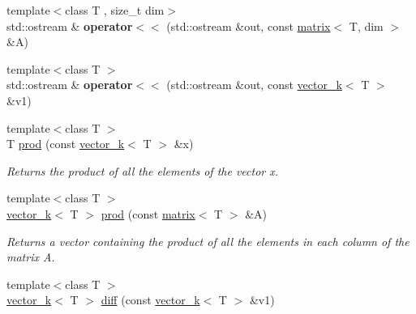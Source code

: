 \begin{DoxyCompactItemize}
\item 
\hypertarget{namespacekeycpp_abdc9a2ec3fa602bd1bad9cd9ea14038e}{{\footnotesize template$<$class T , size\-\_\-t dim$>$ }\\std\-::ostream \& {\bfseries operator$<$$<$} (std\-::ostream \&out, const \hyperlink{classkeycpp_1_1matrix}{matrix}$<$ T, dim $>$ \&A)}\label{namespacekeycpp_abdc9a2ec3fa602bd1bad9cd9ea14038e}

\item 
\hypertarget{namespacekeycpp_a86f8946c126102b4467b70da16766b7a}{{\footnotesize template$<$class T $>$ }\\std\-::ostream \& {\bfseries operator$<$$<$} (std\-::ostream \&out, const \hyperlink{classkeycpp_1_1vector__k}{vector\-\_\-k}$<$ T $>$ \&v1)}\label{namespacekeycpp_a86f8946c126102b4467b70da16766b7a}

\item 
\hypertarget{namespacekeycpp_add55ad2a40111d6368744a3d4144f25a}{{\footnotesize template$<$class T $>$ }\\T \hyperlink{namespacekeycpp_add55ad2a40111d6368744a3d4144f25a}{prod} (const \hyperlink{classkeycpp_1_1vector__k}{vector\-\_\-k}$<$ T $>$ \&x)}\label{namespacekeycpp_add55ad2a40111d6368744a3d4144f25a}

\begin{DoxyCompactList}\small\item\em Returns the product of all the elements of the vector x. \end{DoxyCompactList}\item 
\hypertarget{namespacekeycpp_af5471fc9074471701bde9e68eb7971b4}{{\footnotesize template$<$class T $>$ }\\\hyperlink{classkeycpp_1_1vector__k}{vector\-\_\-k}$<$ T $>$ \hyperlink{namespacekeycpp_af5471fc9074471701bde9e68eb7971b4}{prod} (const \hyperlink{classkeycpp_1_1matrix}{matrix}$<$ T $>$ \&A)}\label{namespacekeycpp_af5471fc9074471701bde9e68eb7971b4}

\begin{DoxyCompactList}\small\item\em Returns a vector containing the product of all the elements in each column of the matrix A. \end{DoxyCompactList}\item 
\hypertarget{namespacekeycpp_a52c37ec9c41349fd6bd862b8ebdd01bb}{{\footnotesize template$<$class T $>$ }\\\hyperlink{classkeycpp_1_1vector__k}{vector\-\_\-k}$<$ T $>$ \hyperlink{namespacekeycpp_a52c37ec9c41349fd6bd862b8ebdd01bb}{diff} (const \hyperlink{classkeycpp_1_1vector__k}{vector\-\_\-k}$<$ T $>$ \&v1)}\label{namespacekeycpp_a52c37ec9c41349fd6bd862b8ebdd01bb}


\end{DoxyCompactItemize}

